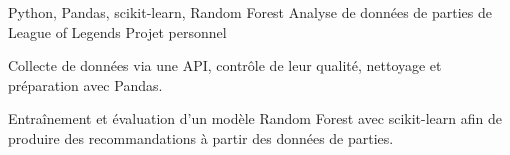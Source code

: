 
\begin{cventries}
  \cventry
    {Python, Pandas, scikit-learn, Random Forest}
    {Analyse de données de parties de League of Legends}
    {Projet personnel}
    {}
    {
      \begin{cvitems}
        \item {Collecte de données via une API, contrôle de leur qualité, nettoyage et préparation avec Pandas.}
        \item {Entraînement et évaluation d’un modèle Random Forest avec scikit-learn afin de produire des recommandations à partir des données de parties.}
      \end{cvitems}
    }
\end{cventries}
